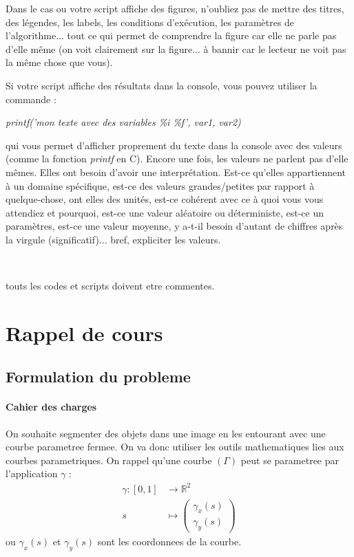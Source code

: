 \documentclass[10pt,a4paper]{article}
\begin{document}
Dans le cas ou votre script affiche des figures,  n'oubliez pas de mettre des titres, des l\'{e}gendes, les labels, les conditions d'ex\'{e}cution, les param\`{e}tres de l'algorithme... tout ce qui permet de comprendre la figure car elle ne parle pas d'elle m\^{e}me (on voit clairement sur la figure... \`{a} bannir car le lecteur ne voit pas la m\^{e}me chose que vous).

Si votre script affiche des r\'{e}sultats dans la console, vous pouvez utiliser la commande :
\begin{center}
 \textit{printf('mon texte avec des variables \%i \%f', var1, var2)}
\end{center}
qui vous permet d'afficher proprement du texte dans la console avec des valeurs (comme la fonction \textit{printf} en C). Encore une fois, les valeurs ne parlent pas d'elle m\^{e}mes. Elles ont besoin d'avoir une interpr\'{e}tation. Est-ce qu'elles appartiennent \`{a} un domaine sp\'{e}cifique, est-ce des valeurs grandes/petites par rapport \`{a} quelque-chose, ont elles des unit\'{e}s, est-ce coh\'{e}rent avec ce \`{a} quoi vous vous attendiez et pourquoi, est-ce une valeur al\'{e}atoire ou d\'{e}terministe, est-ce un param\`{e}tres, est-ce une valeur moyenne, y a-t-il besoin d'autant de chiffres apr\`{e}s la virgule (significatif)... bref, expliciter les valeurs.

~


 touts les codes et scripts doivent etre commentes.




\section{Rappel de cours}
\subsection{Formulation du probleme}
\paragraph{Cahier des charges} On souhaite segmenter des objets dans une image en les entourant avec une courbe parametree fermee. On va donc utiliser les outils mathematiques lies aux courbes parametriques. On rappel qu'une courbe $(\Gamma)$ peut se parametree par l'application $\gamma$ :
\begin{align*}
	\gamma :  [0,1] &\rightarrow \mathbb{R}^2\\
			s &\mapsto \begin{pmatrix}\gamma_x(s)\\ \gamma_y(s)\end{pmatrix}
\end{align*}
ou $\gamma_x(s)$ et $\gamma_y(s)$ sont les coordonnees de la courbe. 
\end{document}
